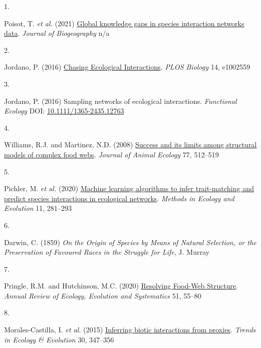 \documentclass[
]{article}
\newlength{\cslhangindent}
\newlength{\csllabelwidth}
\newenvironment{CSLReferences}[2] %
 {\begin{list}{}{%
  \setlength{\itemindent}{0pt}
  \setlength{\leftmargin}{0pt}
  \setlength{\parsep}{0pt}
  \ifodd #1
   \setlength{\leftmargin}{\cslhangindent}
   \setlength{\itemindent}{-1\cslhangindent}
  \fi
  \setlength{\itemsep}{#2\baselineskip}}}
 {\end{list}}
\newcommand{\CSLLeftMargin}[1]{\parbox[t]{\csllabelwidth}{\strut#1\strut}}
\newcommand{\CSLRightInline}[1]{\parbox[t]{\linewidth - \csllabelwidth}{\strut#1\strut}}
\begin{document}
\label{refs}
\begin{CSLReferences}{0}{0}
\CSLLeftMargin{1. }%
\CSLRightInline{Poisot, T. \emph{et al.} (2021)
\href{https://doi.org/10.1111/jbi.14127}{Global knowledge gaps in
species interaction networks data}. \emph{Journal of Biogeography} n/a}

\CSLLeftMargin{2. }%
\CSLRightInline{Jordano, P. (2016)
\href{https://doi.org/10.1371/journal.pbio.1002559}{Chasing {Ecological
Interactions}}. \emph{PLOS Biology} 14, e1002559}

\CSLLeftMargin{3. }%
\CSLRightInline{Jordano, P. (2016) Sampling networks of ecological
interactions. \emph{Functional Ecology} DOI:
\href{https://doi.org/10.1111/1365-2435.12763}{10.1111/1365-2435.12763}}

\CSLLeftMargin{4. }%
\CSLRightInline{Williams, R.J. and Martinez, N.D. (2008)
\href{https://doi.org/10.1111/j.1365-2656.2008.01362.x}{Success and its
limits among structural models of complex food webs}. \emph{Journal of
Animal Ecology} 77, 512--519}

\CSLLeftMargin{5. }%
\CSLRightInline{Pichler, M. \emph{et al.} (2020)
\href{https://doi.org/10.1111/2041-210X.13329}{Machine learning
algorithms to infer trait-matching and predict species interactions in
ecological networks}. \emph{Methods in Ecology and Evolution} 11,
281--293}

\CSLLeftMargin{6. }%
\CSLRightInline{Darwin, C. (1859) \emph{On the {Origin} of {Species} by
{Means} of {Natural Selection}, or the {Preservation} of {Favoured
Races} in the {Struggle} for {Life}}, J. Murray}

\CSLLeftMargin{7. }%
\CSLRightInline{Pringle, R.M. and Hutchinson, M.C. (2020)
\href{https://doi.org/10.1146/annurev-ecolsys-110218-024908}{Resolving
{Food-Web Structure}}. \emph{Annual Review of Ecology, Evolution and
Systematics} 51, 55--80}

\CSLLeftMargin{8. }%
\CSLRightInline{Morales-Castilla, I. \emph{et al.} (2015)
\href{https://doi.org/10.1016/j.tree.2015.03.014}{Inferring biotic
interactions from proxies}. \emph{Trends in Ecology \& Evolution} 30,
347--356}


\end{CSLReferences}
\end{document}
